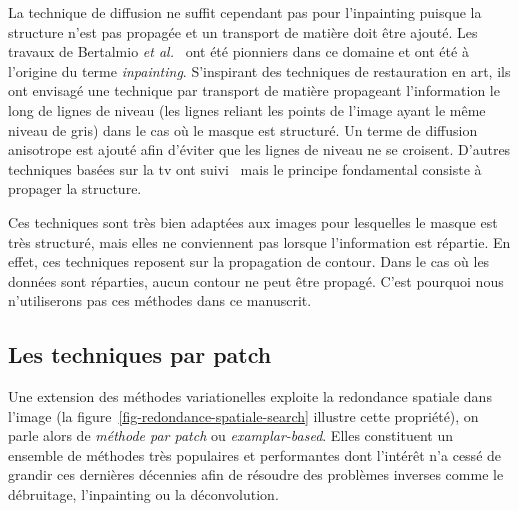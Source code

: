 La technique de diffusion ne suffit cependant pas pour l'inpainting puisque la structure n'est pas propagée et un transport de matière doit être ajouté. Les travaux de Bertalmio \textit{et al.}~\cite{bertalmio2000image} ont été pionniers dans ce domaine et ont été à l'origine du terme \emph{inpainting}. S'inspirant des techniques de restauration en art, ils ont envisagé une technique par transport de matière propageant l'information le long de lignes de niveau (les lignes reliant les points de l'image ayant le même niveau de gris) dans le cas où le masque est structuré. Un terme de diffusion anisotrope est ajouté afin d'éviter que les lignes de niveau ne se croisent. D'autres techniques basées sur la \gls{tv} ont suivi~\cite{shen2002mathematical, chan2001nontexture} mais le principe fondamental consiste à propager la structure.

Ces techniques sont très bien adaptées aux images pour lesquelles le masque est très structuré, mais elles ne conviennent pas lorsque l'information est répartie. En effet, ces techniques reposent sur la propagation de contour. Dans le cas où les données sont réparties, aucun contour ne peut être propagé. C'est pourquoi nous n'utiliserons pas ces méthodes dans ce manuscrit.


\subsection{Les techniques par patch}\label{sec-art-patch}

Une extension des méthodes variationelles exploite la redondance spatiale dans l'image (la figure~\ref{fig-redondance-spatiale-search} illustre cette propriété), on parle alors de \emph{méthode par patch} ou \emph{examplar-based}. Elles constituent un ensemble de méthodes très populaires et performantes dont l'intérêt n'a cessé de grandir ces dernières décennies afin de résoudre des problèmes inverses comme le débruitage, l'inpainting ou la déconvolution.

